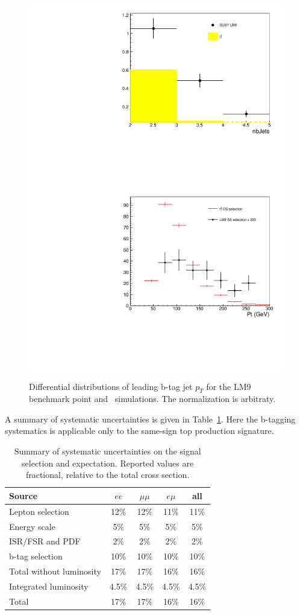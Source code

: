 \begin{figure}[htb]
\begin{center}
\includegraphics[width=0.48\linewidth, height=0.36\linewidth]{figs/lm9.pdf}
\includegraphics[width=0.6\linewidth, height=0.36\linewidth]{figs/bjetleading.pdf}
\caption{ Differential distributions of leading b-tag jet $p_T$ for the 
LM9 benchmark point and \ttbar\ simulations.
The normalization is arbitraty.\label{fig:lm9ttbar}}
\end{center}
\end{figure}


A summary of systematic uncertainties is given in Table~\ref{tab:systSumm}.
Here the b-tagging systematics is applicable only to the same-sign top production signature.

\begin{table}[h]
\begin{center}
\caption{\small\label{tab:systSumm}Summary of systematic uncertainties on the signal selection and
expectation. 
Reported values are fractional, relative to the total cross section.}
\begin{tabular}{lcccc}\hline
Source 					& $ee$		& $\mu\mu$		& $e\mu$	& all \\ \hline
Lepton selection			& 12\%		& 12\%			& 11\%		& 11\% \\
Energy scale				& 5\%		& 5\%			& 5\%		& 5\% \\
ISR/FSR and PDF				& 2\%		& 2\%			& 2\%		& 2\% 	\\
b-tag selection                         & 10\%          & 10\%                  & 10\%          & 10\% \\
Total without luminosity		& 17\%		& 17\%			& 16\%		& 16\%\\ \hline
Integrated luminosity			& 4.5\%		& 4.5\%			& 4.5\%		& 4.5\%	\\ \hline
Total 					& 17\%	 	& 17\%	 		& 16\% 		& 16\% \\
\hline
\end{tabular}
\end{center}
\end{table}
